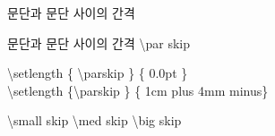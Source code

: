 \documentclass[ aspectratio=149,  14pt,blue,xcolor=pdftex,dvipsnames,table,handout,notes]{beamer}
\begin{document}
		\begin{frame}[t]{문단과 문단 사이의 간격}

			\begin{block} {문단과 문단 사이의 간격}
			\textbackslash par skip
			\end{block}

			\begin{example}
			\textbackslash setlength \{ \textbackslash parskip \} \{ 0.0pt \}\\
			\textbackslash setlength \{\textbackslash parskip \} \{ 1cm plus 4mm minus\}	\\		
			\end{example}

			\begin{example}
			\textbackslash small skip
			\textbackslash med skip
			\textbackslash big skip
			\end{example}

		
		\end{frame}
\end{document}
